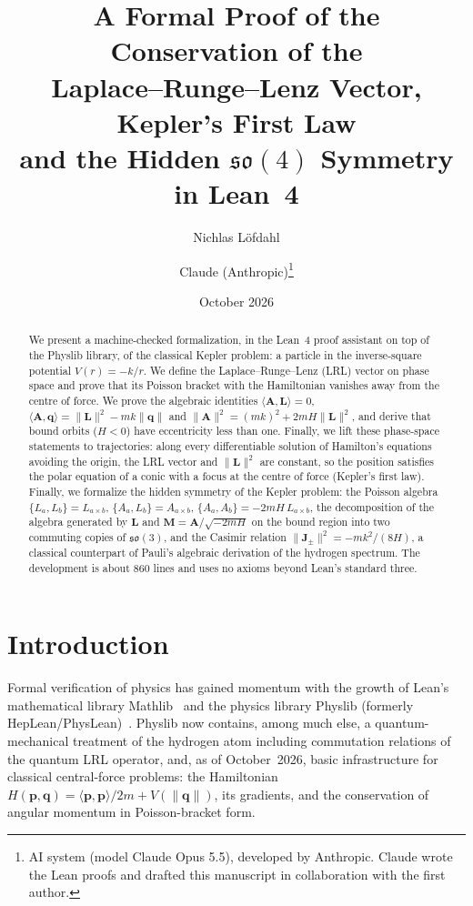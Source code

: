 \documentclass[11pt]{article}
\title{A Formal Proof of the Conservation of the\\ Laplace--Runge--Lenz Vector, Kepler's First Law\\ and the Hidden $\mathfrak{so}(4)$ Symmetry in Lean~4}
\author{Nichlas Löfdahl \and Claude (Anthropic)\thanks{AI system (model Claude Opus 5.5), developed by Anthropic.
Claude wrote the Lean proofs and drafted this manuscript in collaboration with the first author.}}
\date{October 2026}
\theoremstyle{definition}
\theoremstyle{remark}
\newcommand{\vA}{\mathbf{A}}
\newcommand{\vL}{\mathbf{L}}
\newcommand{\vp}{\mathbf{p}}
\newcommand{\vq}{\mathbf{q}}
\newcommand{\vM}{\mathbf{M}}
\newcommand{\vJ}{\mathbf{J}}
\newcommand{\ip}[2]{\langle #1, #2\rangle}
\begin{document}
\sloppy
\maketitle

\begin{abstract}
We present a machine-checked formalization, in the Lean~4 proof assistant on top of the Physlib
library, of the classical Kepler problem: a particle in the inverse-square potential
$V(r)=-k/r$. We define the Laplace--Runge--Lenz (LRL) vector on phase space and prove that its
Poisson bracket with the Hamiltonian vanishes away from the centre of force. We prove the
algebraic identities $\ip{\vA}{\vL}=0$, $\ip{\vA}{\vq}=\|\vL\|^2-mk\|\vq\|$ and
$\|\vA\|^2=(mk)^2+2mH\|\vL\|^2$, and derive that bound orbits ($H<0$) have eccentricity less than
one. Finally, we lift these phase-space statements to trajectories: along every differentiable
solution of Hamilton's equations avoiding the origin, the LRL vector and $\|\vL\|^2$ are constant,
so the position satisfies the polar equation of a conic with a focus at the centre of force
(Kepler's first law). Finally, we formalize the hidden symmetry of the Kepler problem: the
Poisson algebra $\{L_a,L_b\}=L_{a\times b}$, $\{A_a,L_b\}=A_{a\times b}$,
$\{A_a,A_b\}=-2mH\,L_{a\times b}$, the decomposition of the algebra generated by $\vL$ and
$\vM=\vA/\sqrt{-2mH}$ on the bound region into two commuting copies of $\mathfrak{so}(3)$, and
the Casimir relation $\|\vJ_\pm\|^2=-mk^2/(8H)$, a classical counterpart of Pauli's algebraic
derivation of the hydrogen spectrum. The development is about 860 lines and uses no axioms beyond
Lean's standard three.
\end{abstract}

\section{Introduction}

Formal verification of physics has gained momentum with the growth of Lean's
mathematical library Mathlib~\cite{mathlib2020} and the physics library
Physlib (formerly HepLean/PhysLean)~\cite{toobysmith2024heplean}. Physlib now contains, among much else,
a quantum-mechanical treatment of the hydrogen atom including commutation relations of the
quantum LRL operator, and, as of October~2026, basic infrastructure for classical central-force
problems: the Hamiltonian $H(\vp,\vq)=\ip{\vp}{\vp}/2m+V(\|\vq\|)$, its gradients, and the
conservation of angular momentum in Poisson-bracket form.
\end{document}
